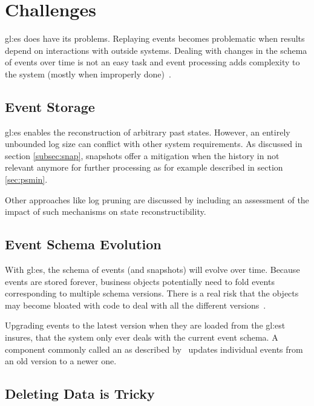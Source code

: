 \section{Challenges}

\gls{gl:es} does have its problems. Replaying events becomes problematic when results depend on interactions with outside systems. Dealing with changes in the schema of events over time is not an easy task and event processing adds complexity to the system (mostly when improperly done)~\citep{esvsed}.

\subsection{Event Storage}

\gls{gl:es} enables the reconstruction of arbitrary past states. However, an entirely unbounded log size can conflict with other system requirements. As discussed in section \ref{subsec:snap}, snapshots offer a mitigation when the history in not relevant anymore for further processing as for example described in section \ref{sec:psmin}.

Other approaches like log pruning are discussed by \citep{10.1145/3210284.3219767} including an assessment of the impact of such mechanisms on state reconstructibility.

\subsection{Event Schema Evolution}

With \gls{gl:es}, the schema of events (and snapshots) will evolve over time. Because events are stored forever, business objects potentially need to fold events corresponding to multiple schema versions. There is a real risk that the objects may become bloated with code to deal with all the different versions~\citep{richardson2018microservices}. 

Upgrading events to the latest version when they are loaded from the \gls{gl:est} insures, that the system only ever deals with the current event schema. A component commonly called an  as described by~\citep{richardson2018microservices} updates individual events from an old version to a newer one.

\subsection{Deleting Data is Tricky}

